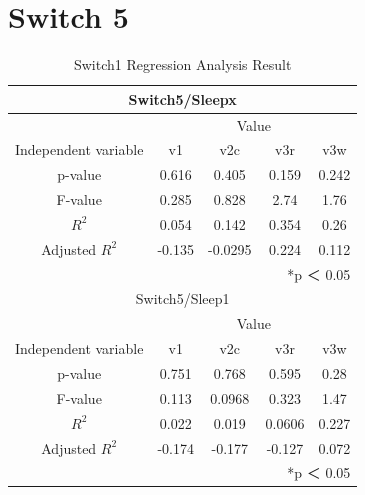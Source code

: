 \documentclass[11pt
  , a4paper
  , article
  , oneside
]{memoir}
\begin{document}
\section{Switch 5}
\begin{table}[h!]
\begin{center}
\begin{tabular}{c|c||c||c||c}
\multicolumn{5}{c}{Switch5/Sleepx}\\ \hline\hline
\multicolumn{1}{c|}{}& \multicolumn{4}{c}{Value}\\
\cline{1-5}
Independent variable & v1 & v2c & v3r & v3w      \\ \hline\hline
p-value & 0.616 & 0.405& 0.159 & 0.242\\ 
F-value & 0.285 & 0.828& 2.74 & 1.76\\ 
$  R^2  $ & 0.054 & 0.142& 0.354 & 0.26\\ 
Adjusted $  R^2  $ & -0.135 & -0.0295& 0.224 & 0.112\\ \hline\hline
\multicolumn{5}{r}{*p ＜ 0.05} \\ 
\multicolumn{5}{c}{Switch5/Sleep1}\\ \hline\hline
\multicolumn{1}{c|}{}& \multicolumn{4}{c}{Value}\\
\cline{1-5}
Independent variable & v1 & v2c & v3r & v3w      \\ \hline\hline
p-value & 0.751 & 0.768 & 0.595 & 0.28\\ 
F-value & 0.113 & 0.0968 & 0.323 & 1.47\\ 
$  R^2  $ & 0.022 & 0.019& 0.0606 & 0.227\\ 
Adjusted $  R^2  $ & -0.174 & -0.177 & -0.127 & 0.072\\ \hline\hline
\multicolumn{5}{r}{*p ＜ 0.05} \\ 
\end{tabular}
\caption{Switch1 Regression Analysis Result }
\end{center}
\end{table} 






\clearpage


\end{document}
